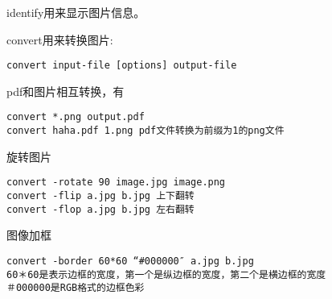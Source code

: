 identify用来显示图片信息。

convert用来转换图片:
\begin{verbatim}
convert input-file [options] output-file
\end{verbatim}

pdf和图片相互转换，有
\begin{verbatim}
convert *.png output.pdf
convert haha.pdf 1.png pdf文件转换为前缀为1的png文件
\end{verbatim}

旋转图片
\begin{verbatim}
convert -rotate 90 image.jpg image.png
convert -flip a.jpg b.jpg 上下翻转
convert -flop a.jpg b.jpg 左右翻转
\end{verbatim}

图像加框
\begin{verbatim}
convert -border 60*60 “#000000″ a.jpg b.jpg
60＊60是表示边框的宽度，第一个是纵边框的宽度，第二个是横边框的宽度
＃000000是RGB格式的边框色彩
\end{verbatim}



